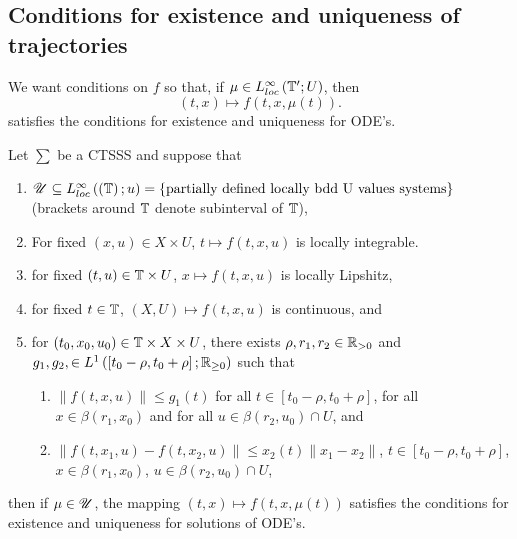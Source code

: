 \subsection{Conditions for existence and uniqueness of trajectories}

We want conditions on $f$ so that, if  $\mu \in  L^{\infty}_{loc}\left( \mathbb{T} ' ; U \right) $, then 
\[
	\left( t, x  \right) \longmapsto f\left( t, x, \mu\left( t \right)  \right) 
.\] 
satisfies the conditions for existence and uniqueness for ODE's.

\begin{theorem}
	Let $\sum $ be a CTSSS and suppose that 
	\begin{enumerate}
		\item $\mathscr{U} \subseteq L^{\infty}_{loc}\left( \left( \mathbb{T} \right) ; u \right) = \left\{ \text{partially defined locally bdd U values systems} \right\}  $ (brackets around $\mathbb{T}$ denote subinterval of $\mathbb{T}$), 
		\item For fixed $\left( x, u \right)  \in  X \times  U$, $t \longmapsto f \left( t, x , u \right) $ is locally integrable. 
		\item for fixed $\left( t, u  \right) \in  \mathbb{T} \times  U$, $x \longmapsto f\left( t, x, u \right) $ is locally Lipshitz, 
		\item for fixed $t \in  \mathbb{T}$, $\left( X, U \right)  \longmapsto f \left( t, x, u \right) $ is continuous, and 
		\item for $\left( t_0, x_0, u_0 \right) \in  \mathbb{T} \times  X \times  U$, there exists $\rho, r_1, r_2 \in \mathbb{R}_{>0}$ and $g_1, g_2, \in  L^{1}\left( \left[ t_0 - \rho, t_0 + \rho \right] ; \mathbb{R}_{\ge  0} \right) $ such that 
			\begin{enumerate}
				\item $\|f\left( t, x, u \right) \|\le  g_1 \left( t \right) $ for all $t \in  \left[ t_0 - \rho, t_0 + \rho \right] $, for all $x \in  \beta \left( r_1, x_0 \right) $ and for all $u \in  \beta \left( r_2, u_0 \right) \cap U$, and 
				\item $\|f\left( t, x_1, u \right) - f\left( t, x_2, u \right) \|\le  x_2 \left( t \right) \|x_1 - x_2\|$, $t \in  \left[ t_0 - \rho, t_0 + \rho \right] $, $x \in  \beta \left( r_1, x_0 \right) $, $u \in  \beta \left( r_2, u_0 \right) \cap  U$, 
			\end{enumerate}
	\end{enumerate}
	then if $\mu \in \mathscr{U}$, the mapping $\left( t, x \right) \longmapsto f \left( t, x, \mu\left( t \right)  \right) $ satisfies the conditions for existence and uniqueness for solutions of ODE's. 
\end{theorem}

